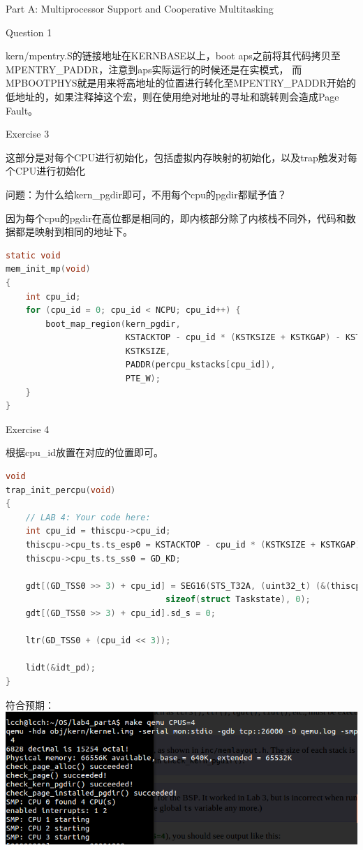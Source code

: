 \documentclass[GBK,winfonts,a4paper,10pt]{ctexart}
\begin{document}
\begin{section}{Part A: Multiprocessor Support and Cooperative Multitasking}
\begin{subsection}{Question 1}
\par
kern/mpentry.S的链接地址在KERNBASE以上，boot aps之前将其代码拷贝至MPENTRY\_PADDR，注意到aps实际运行的时候还是在实模式， 而MPBOOTPHYS就是用来将高地址的位置进行转化至MPENTRY\_PADDR开始的低地址的，如果注释掉这个宏，则在使用绝对地址的寻址和跳转则会造成Page Fault。
\end{subsection}

\begin{subsection}{Exercise 3}
\par
这部分是对每个CPU进行初始化，包括虚拟内存映射的初始化，以及trap触发对每个CPU进行初始化
\par
问题：为什么给kern\_pgdir即可，不用每个cpu的pgdir都赋予值？
\par
因为每个cpu的pgdir在高位都是相同的，即内核部分除了内核栈不同外，代码和数据都是映射到相同的地址下。
\begin{lstlisting}[language=C]
static void
mem_init_mp(void)
{    
    int cpu_id;
    for (cpu_id = 0; cpu_id < NCPU; cpu_id++) {
        boot_map_region(kern_pgdir,
                        KSTACKTOP - cpu_id * (KSTKSIZE + KSTKGAP) - KSTKSIZE,
                        KSTKSIZE,
                        PADDR(percpu_kstacks[cpu_id]),
                        PTE_W);
    }
}
\end{lstlisting}
\end{subsection}

\begin{subsection}{Exercise 4}
\par
根据cpu\_id放置在对应的位置即可。
\begin{lstlisting}[language=C]
void
trap_init_percpu(void)
{
	// LAB 4: Your code here:
    int cpu_id = thiscpu->cpu_id;
    thiscpu->cpu_ts.ts_esp0 = KSTACKTOP - cpu_id * (KSTKSIZE + KSTKGAP);
    thiscpu->cpu_ts.ts_ss0 = GD_KD;

    gdt[(GD_TSS0 >> 3) + cpu_id] = SEG16(STS_T32A, (uint32_t) (&(thiscpu->cpu_ts)),
    							sizeof(struct Taskstate), 0);
    gdt[(GD_TSS0 >> 3) + cpu_id].sd_s = 0;

    ltr(GD_TSS0 + (cpu_id << 3));

    lidt(&idt_pd);
}
\end{lstlisting}
\par
符合预期：
\includegraphics[scale=0.5]{pic1.png}
\end{subsection}


\end{section}
\end{document}
